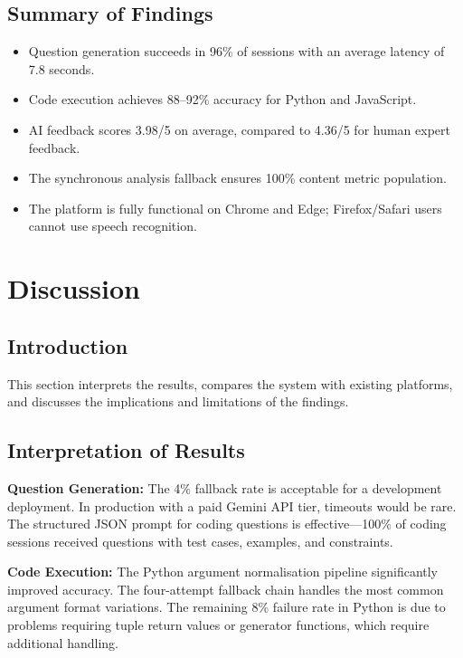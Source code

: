 \subsection{Summary of Findings}

\begin{itemize}
    \item Question generation succeeds in 96\% of sessions with an average latency of 7.8 seconds.
    \item Code execution achieves 88--92\% accuracy for Python and JavaScript.
    \item AI feedback scores 3.98/5 on average, compared to 4.36/5 for human expert feedback.
    \item The synchronous analysis fallback ensures 100\% content metric population.
    \item The platform is fully functional on Chrome and Edge; Firefox/Safari users cannot use speech recognition.
\end{itemize}

\section{Discussion}

\subsection{Introduction}

This section interprets the results, compares the system with existing platforms, and discusses the implications and limitations of the findings.

\subsection{Interpretation of Results}

\textbf{Question Generation:} The 4\% fallback rate is acceptable for a development deployment. In production with a paid Gemini API tier, timeouts would be rare. The structured JSON prompt for coding questions is effective---100\% of coding sessions received questions with test cases, examples, and constraints.

\textbf{Code Execution:} The Python argument normalisation pipeline significantly improved accuracy. The four-attempt fallback chain handles the most common argument format variations. The remaining 8\% failure rate in Python is due to problems requiring tuple return values or generator functions, which require additional handling.

